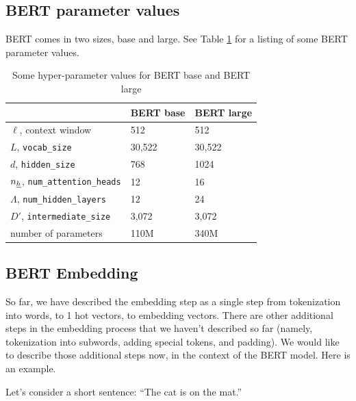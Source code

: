 \subsection{BERT parameter values}

BERT comes in two sizes, base and large.
See Table \ref{tab-bert} for a listing
of some BERT parameter values.

\begin{table}[h!]
\centering
\begin{tabular}{|l|l|l|}
\hline
 & \cellcolor[HTML]{FFFFC7}BERT base & \cellcolor[HTML]{FFFFC7}BERT large \\ \hline
\cellcolor[HTML]{FFFFC7}$\ell$, context window& 512 & 512 \\ \hline
\cellcolor[HTML]{FFFFC7}$L$, {\tt vocab\_size} & 30,522 & 30,522 \\ \hline
\cellcolor[HTML]{FFFFC7}$d$, {\tt hidden\_size} & 768 & 1024 \\ \hline
\cellcolor[HTML]{FFFFC7}$n_{\underline{h}}$, {\tt num\_attention\_heads} & 12 & 16 \\ \hline
\cellcolor[HTML]{FFFFC7}$\Lambda$, {\tt num\_hidden\_layers} & 12 & 24 \\ \hline
\cellcolor[HTML]{FFFFC7}$D'$, {\tt intermediate\_size} & 3,072 & 3,072 \\ \hline
\cellcolor[HTML]{FFFFC7}number of parameters & 110M & 340M \\ \hline
\end{tabular}
\caption{Some hyper-parameter values for BERT base and BERT large}
\label{tab-bert}
\end{table}

\subsection{BERT Embedding}
So far, we have described the embedding step as a single step
from tokenization into words, to 1 hot vectors, to embedding vectors.
 There are
other additional steps in  the embedding
process that  we haven't
described so far (namely, tokenization
into subwords,
adding special tokens, and
padding). We would like to 
describe those additional steps now, in the context of
 the BERT model. Here is an example.


Let's consider a short sentence: ``The cat is on the mat.''

